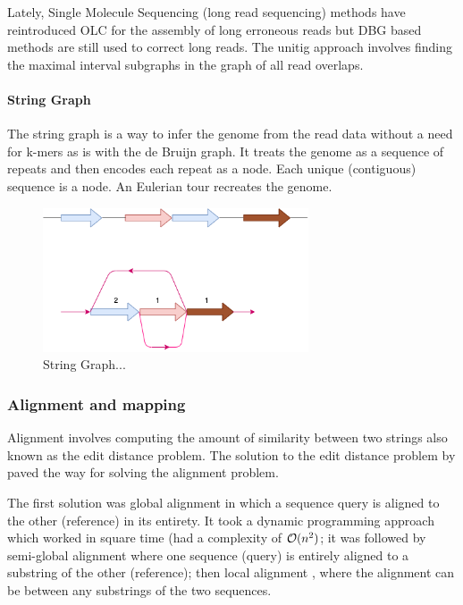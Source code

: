 \documentclass[10pt, a4paper]{article}
\begin{document}
Lately, Single Molecule Sequencing (long read sequencing)  methods have
reintroduced OLC for the assembly of long erroneous reads but DBG based methods
are still used to correct long reads.
The unitig approach involves finding the maximal interval subgraphs in the
graph of all read overlaps.

\paragraph{String Graph}
\label{sec:org42d1276}
The string graph \cite{myersFragmentAssemblyString2005} is a way to infer the
genome from the read data without a need for k-mers as is with the de Bruijn
graph.  It treats the genome as a sequence of repeats and then encodes each
repeat as a node. Each unique (contiguous) sequence is a node.
An Eulerian tour recreates the genome.

\begin{figure}[H]
\centering
\includegraphics[width=0.7\textwidth]{figures/String Graph.png}
\caption{String Graph...}
\end{figure}\label{string graph}

\subsubsection{Alignment and mapping}
\label{sec:orgbda4a2e}
Alignment involves computing the amount of similarity between two strings also
known as the edit distance problem.
The solution to the edit distance problem by
\cite{levenshteinBinaryCodesCapable1966a} paved the way for solving the alignment
problem.

The first solution was global alignment
\cite{needlemanGeneralMethodApplicable1970} in which a sequence query is aligned
to the other (reference) in its entirety. It took a dynamic programming approach
which worked in square time (had a complexity of \(\mathcal{O}(n^2)\); it was followed
by semi-global alignment \cite{sellersTheoryComputationEvolutionary1980}
where one sequence (query) is entirely
aligned to a substring of the other (reference); then local alignment
\cite{smithIdentificationCommonMolecular1981}, where the alignment can be between
any substrings of the two sequences.
\end{document}
